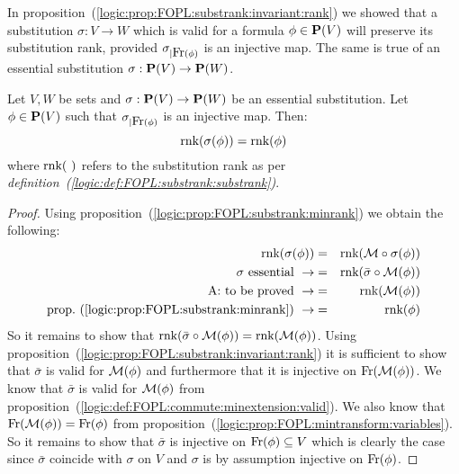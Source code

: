 In proposition~(\ref{logic:prop:FOPL:substrank:invariant:rank}) we
showed that a substitution $\sigma:V\to W$ which is valid for a
formula $\phi\in\mbox{${\bf P}(V)$}$ will preserve its substitution rank, provided
$\sigma_{|\mbox{\rm Fr}(\phi)}$ is an injective map. The same is true of an
essential substitution $\sigma:\mbox{${\bf P}(V)$}\to{\bf P}(W)$.
\begin{prop}\label{logic:prop:FOPL:esssubstprop:rank:injective}
Let $V,W$ be sets and $\sigma:\mbox{${\bf P}(V)$}\to{\bf P}(W)$ be an essential
substitution. Let $\phi\in\mbox{${\bf P}(V)$}$ such that $\sigma_{|\mbox{\rm Fr}(\phi)}$ is
an injective map. Then:
    \[
    \mbox{\rm rnk}(\sigma(\phi))=\mbox{\rm rnk}(\phi)
    \]
where $\mbox{\rm rnk}(\,\,)$ refers to the substitution rank as per {\em
definition~(\ref{logic:def:FOPL:substrank:substrank})}.
\end{prop}
\begin{proof}
Using proposition~(\ref{logic:prop:FOPL:substrank:minrank}) we
obtain the following:
    \begin{eqnarray*}
    \mbox{\rm rnk}(\sigma(\phi))&=&\mbox{\rm rnk}({\cal M}\circ\sigma(\phi))\\
    \mbox{$\sigma$ essential}\ \rightarrow
    &=&\mbox{\rm rnk}(\bar{\sigma}\circ{\cal M}(\phi))\\
    \mbox{A: to be proved}\ \rightarrow
    &=&\mbox{\rm rnk}({\cal M}(\phi))\\
    \mbox{prop.~(\ref{logic:prop:FOPL:substrank:minrank})}\ \rightarrow
    &=&\mbox{\rm rnk}(\phi)
    \end{eqnarray*}
So it remains to show that $\mbox{\rm rnk}(\bar{\sigma}\circ{\cal
M}(\phi))=\mbox{\rm rnk}({\cal M}(\phi))$. Using
proposition~(\ref{logic:prop:FOPL:substrank:invariant:rank}) it is
sufficient to show that $\bar{\sigma}$ is valid for ${\cal M}(\phi)$
and furthermore that it is injective on $\mbox{\rm Fr}({\cal M}(\phi))$. We
know that $\bar{\sigma}$ is valid for ${\cal M}(\phi)$ from
proposition~(\ref{logic:def:FOPL:commute:minextension:valid}). We
also know that $\mbox{\rm Fr}({\cal M}(\phi))=\mbox{\rm Fr}(\phi)$ from
proposition~(\ref{logic:prop:FOPL:mintransform:variables}). So it
remains to show that $\bar{\sigma}$ is injective on
$\mbox{\rm Fr}(\phi)\subseteq V$ which is clearly the case since
$\bar{\sigma}$ coincide with $\sigma$ on $V$ and $\sigma$ is by
assumption injective on $\mbox{\rm Fr}(\phi)$.
\end{proof}

